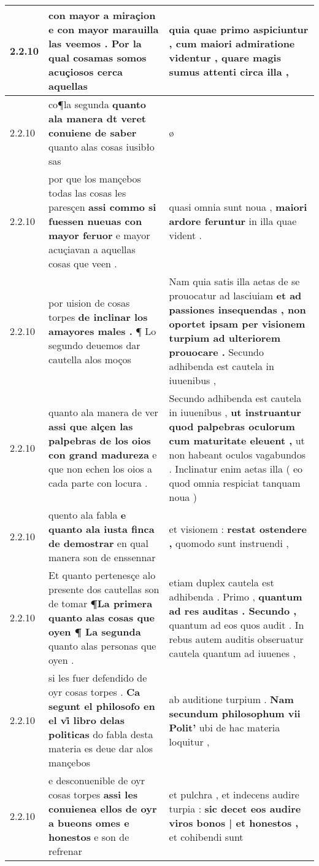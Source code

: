 \begin{tabular}{|p{1cm}|p{6.5cm}|p{6.5cm}|}
2.2.10 & con mayor a miraçion \textbf{ e con mayor marauilla las veemos . } Por la qual cosamas somos acuçiosos cerca aquellas & quia quae primo aspiciuntur , \textbf{ cum maiori admiratione videntur , } quare magis sumus attenti circa illa , \\\hline
2.2.10 & co¶la segunda \textbf{ quanto ala manera dt veret conuiene de saber } quanto alas cosas iusibło sas & ø \\\hline
2.2.10 & por que los mançebos todas las cosas les paresçen \textbf{ assi commo si fuessen nueuas con mayor feruor } e mayor acuçiavan a aquellas cosas que veen . & quasi omnia sunt noua , \textbf{ maiori ardore feruntur } in illa quae vident . \\\hline
2.2.10 & por uision de cosas torpes \textbf{ de inclinar los amayores males . } ¶ Lo segundo deuemos dar cautella alos moços & Nam quia satis illa aetas de se prouocatur ad lasciuiam \textbf{ et ad passiones insequendas , non oportet ipsam per visionem turpium ad ulteriorem prouocare . } Secundo adhibenda est cautela in iuuenibus , \\\hline
2.2.10 & quanto ala manera de ver \textbf{ assi que alçen las palpebras de los oios con grand madureza } e que non echen los oios a cada parte con locura . & Secundo adhibenda est cautela in iuuenibus , \textbf{ ut instruantur quod palpebras oculorum cum maturitate eleuent , } ut non habeant oculos vagabundos . Inclinatur enim aetas illa ( eo quod omnia respiciat tanquam noua ) \\\hline
2.2.10 & quento ala fabla \textbf{ e quanto ala iusta finca de demostrar } en qual manera son de enssennar & et visionem : \textbf{ restat ostendere , } quomodo sunt instruendi , \\\hline
2.2.10 & Et quanto pertenesçe alo presente dos cautellas son de tomar \textbf{ ¶La primera quanto alas cosas que oyen ¶ La segunda } quanto alas personas que oyen . & etiam duplex cautela est adhibenda . Primo , \textbf{ quantum ad res auditas . Secundo , } quantum ad eos quos audit . In rebus autem auditis obseruatur cautela quantum ad iuuenes , \\\hline
2.2.10 & si les fuer defendido de oyr cosas torpes . \textbf{ Ca segunt el philosofo en el vi̊ libro delas politicas } do fabla desta materia es deue dar alos mançebos & ab auditione turpium . \textbf{ Nam secundum philosophum vii Polit’ } ubi de hac materia loquitur , \\\hline
2.2.10 & e desconuenible de oyr cosas torpes \textbf{ assi les conuienea ellos de oyr a bueons omes e honestos } e son de refrenar & et pulchra , et indecens audire turpia : \textbf{ sic decet eos audire viros bonos | et honestos , } et cohibendi sunt \\\hline

\end{tabular}
